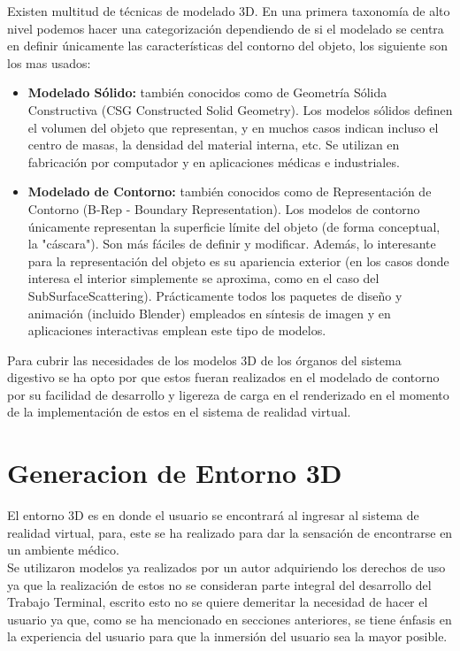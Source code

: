 Existen multitud de técnicas de modelado 3D. En una primera taxonomía de alto nivel podemos hacer una categorización dependiendo de si el modelado se centra en definir únicamente las características del contorno del objeto, los siguiente son los mas usados:\\
\begin{itemize}
\item \textbf{Modelado Sólido:} también conocidos como de Geometría Sólida Constructiva (CSG Constructed Solid Geometry). Los modelos sólidos definen el volumen del objeto que representan, y en muchos casos indican incluso el centro de masas, la densidad del material interna, etc. Se utilizan en fabricación por computador y en aplicaciones médicas e industriales.
\item \textbf{Modelado de Contorno:} también conocidos como de Representación de Contorno (B-Rep - Boundary Representation). Los modelos de contorno únicamente representan la superficie límite del objeto (de forma conceptual, la "cáscara"). Son más fáciles de definir y modificar. Además, lo interesante para la representación del objeto es su apariencia exterior (en los casos donde interesa el interior simplemente se aproxima, como en el caso del SubSurfaceScattering). Prácticamente todos los paquetes de diseño y animación (incluido Blender) empleados en síntesis de imagen y en aplicaciones interactivas emplean este tipo de modelos.
\end{itemize}
Para  cubrir las necesidades de los modelos 3D de los órganos del sistema digestivo se ha opto por que estos fueran realizados en el modelado de contorno por su facilidad de desarrollo y ligereza de carga en el renderizado en el momento de la implementación de estos en el sistema de realidad virtual.\\

\section{Generacion de Entorno 3D}
El entorno 3D es en donde el usuario se encontrará al ingresar al sistema de realidad virtual, para, este se ha realizado para dar la sensación de encontrarse en un ambiente médico.\\

Se utilizaron modelos ya realizados por un autor adquiriendo los derechos de uso ya que la realización de estos no se consideran parte integral del desarrollo del Trabajo Terminal, escrito esto no se quiere demeritar la necesidad de hacer el usuario ya que, como se ha mencionado en secciones anteriores, se tiene énfasis en la experiencia del usuario para que la inmersión del usuario sea la mayor posible.\\

